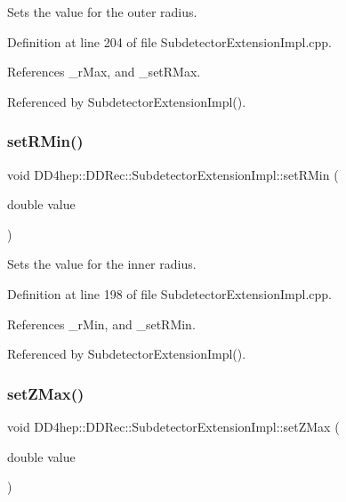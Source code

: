 Sets the value for the outer radius. 



Definition at line 204 of file Subdetector\+Extension\+Impl.\+cpp.



References \+\_\+r\+Max, and \+\_\+set\+R\+Max.



Referenced by Subdetector\+Extension\+Impl().

\hypertarget{class_d_d4hep_1_1_d_d_rec_1_1_subdetector_extension_impl_af2d58ea0ea65579e473364de314720ca}{}\label{class_d_d4hep_1_1_d_d_rec_1_1_subdetector_extension_impl_af2d58ea0ea65579e473364de314720ca} 
\subsubsection{\texorpdfstring{set\+R\+Min()}{setRMin()}}
{\footnotesize\ttfamily void D\+D4hep\+::\+D\+D\+Rec\+::\+Subdetector\+Extension\+Impl\+::set\+R\+Min (\begin{DoxyParamCaption}\item[{double}]{value }\end{DoxyParamCaption})}



Sets the value for the inner radius. 



Definition at line 198 of file Subdetector\+Extension\+Impl.\+cpp.



References \+\_\+r\+Min, and \+\_\+set\+R\+Min.



Referenced by Subdetector\+Extension\+Impl().

\hypertarget{class_d_d4hep_1_1_d_d_rec_1_1_subdetector_extension_impl_ad4ff27b7c8cf4e9f0cdcd595fb271226}{}\label{class_d_d4hep_1_1_d_d_rec_1_1_subdetector_extension_impl_ad4ff27b7c8cf4e9f0cdcd595fb271226} 
\subsubsection{\texorpdfstring{set\+Z\+Max()}{setZMax()}}
{\footnotesize\ttfamily void D\+D4hep\+::\+D\+D\+Rec\+::\+Subdetector\+Extension\+Impl\+::set\+Z\+Max (\begin{DoxyParamCaption}\item[{double}]{value }\end{DoxyParamCaption})}



